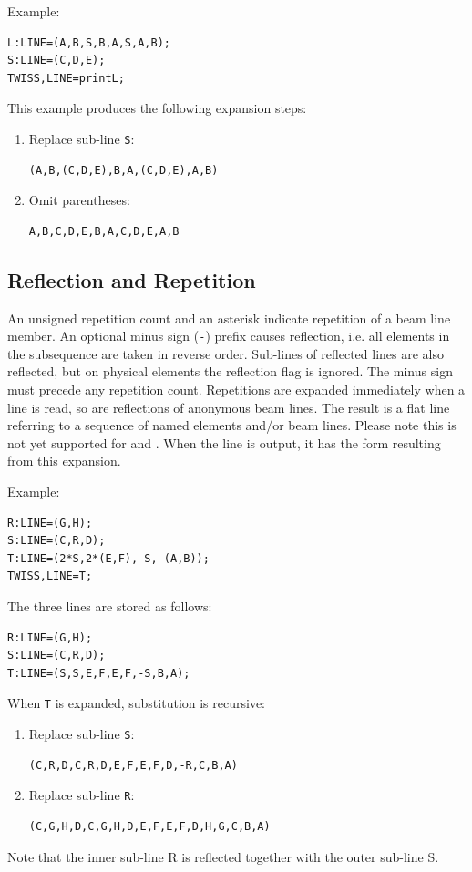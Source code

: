 Example:
\begin{verbatim}
L:LINE=(A,B,S,B,A,S,A,B);
S:LINE=(C,D,E);
TWISS,LINE=printL;
\end{verbatim}
This example produces the following expansion steps:
\begin{enumerate}
\item Replace sub-line \texttt{S}:
\begin{verbatim}
(A,B,(C,D,E),B,A,(C,D,E),A,B)
\end{verbatim}
\item Omit parentheses:
\begin{verbatim}
A,B,C,D,E,B,A,C,D,E,A,B
\end{verbatim}
\end{enumerate}

\subsection{Reflection and Repetition}
\label{sec:refrep}
An unsigned repetition count and an asterisk indicate
repetition of a beam line member.
An optional minus sign (\texttt{-}) prefix causes reflection,
i.e. all elements in the subsequence are taken in reverse order.
Sub-lines of reflected lines are also reflected,
but on physical elements the reflection flag is ignored.
The minus sign must precede any repetition count.
Repetitions are expanded immediately when a line is read,
so are reflections of anonymous beam lines.
The result is a flat line referring to a sequence of named elements and/or
beam lines.
Please note this is not yet supported for \noopalt and \noopalcycl .
When the line is output, it has the form resulting from this expansion.

Example:
\begin{verbatim}
R:LINE=(G,H);
S:LINE=(C,R,D);
T:LINE=(2*S,2*(E,F),-S,-(A,B));
TWISS,LINE=T;
\end{verbatim}
The three lines are stored as follows:
\begin{verbatim}
R:LINE=(G,H);
S:LINE=(C,R,D);
T:LINE=(S,S,E,F,E,F,-S,B,A);
\end{verbatim}
When \texttt{T} is expanded, substitution is recursive:
\begin{enumerate}
\item Replace sub-line \texttt{S}:
\begin{verbatim}
(C,R,D,C,R,D,E,F,E,F,D,-R,C,B,A)
\end{verbatim}
\item Replace sub-line \texttt{R}:
\begin{verbatim}
(C,G,H,D,C,G,H,D,E,F,E,F,D,H,G,C,B,A)
\end{verbatim}
\end{enumerate}
Note that the inner sub-line R is reflected together with
the outer sub-line S.

